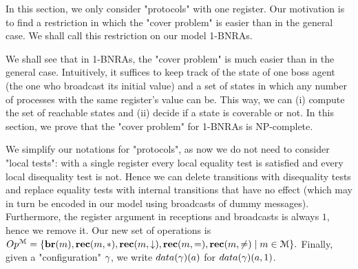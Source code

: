 	In this section, we only consider "protocols" with one register. Our motivation is to find a restriction in which the "cover problem" is easier than in the general case. We shall call this restriction on our model 1-BNRAs.

	We shall see that in 1-BNRAs, the "cover problem" is much easier than in the general case. Intuitively, it suffices to keep track of the state of one boss agent (the one who broadcast its initial value) and a set of states in which any number of processes with the same register's value can be. This way, we can (i) compute the set of reachable states and (ii) decide if a state is coverable or not. In this section, we prove that the "cover problem" for 1-BNRAs is NP-complete.

	We simplify our notations for "protocols", as now we do not need to consider "local tests": with a single register every local equality test is satisfied and every local disequality test is not.
	Hence we can delete transitions with disequality tests and replace equality tests with internal transitions that have no effect (which may in turn be encoded in our model using broadcasts of dummy messages).  
	Furthermore, the register argument in receptions and broadcasts is always $1$, hence we remove it.
	Our new set of operations is 
	$
	Op^{\mathcal{M}} = \{\textbf{br}(m), \textbf{rec}(m, {*}), \textbf{rec}(m, \downarrow), \textbf{rec}(m, {=}), \textbf{rec}(m, {\ne}) \mid m \in \mathcal{M}\}.
	$
	Finally, given a "configuration" $\gamma$, we write $\data{\config}(a)$ for $\data{\config}(a,1)$. 

		



